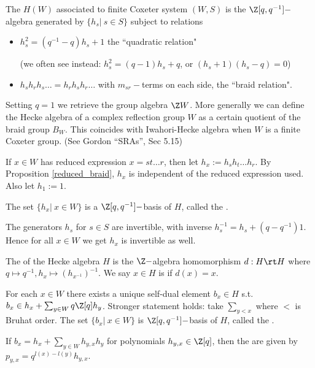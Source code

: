 \begin{definition} The  $H(W)$ associated to finite Coxeter system $(W,S)$ is the $\Z[q,q^{-1}]-$algebra generated by $\{h_s|\ s\in S\}$ subject to relations \begin{itemize}
  \item $h_s^2=(q^{-1}-q)h_s+1$ the ``quadratic relation" 
  
  (we often see instead: $h_s^2=(q-1)h_s+q$, or $(h_s+1)(h_s-q)=0$)
  \item $h_s h_r h_s\dots =h_r h_s h_r \dots $ with $m_{sr}-$terms on each side, the ``braid relation".
\end{itemize}
Setting $q=1$ we retrieve the group algebra $\Z W$. More generally we can define the Hecke algebra of a complex reflection group $W$ as a certain quotient of the braid group $B_W$. This coincides with Iwahori-Hecke algebra when $W$ is a finite Coxeter group. (See Gordon ``SRAs'', Sec 5.15)
\end{definition}

\nt If $x\in W$ has reduced expression $x=st\dots r$, then let $h_x:=h_s h_t\dots h_r$. By Proposition \ref{reduced_braid}, $h_x$ is independent of the reduced expression used. Also let $h_1:=1$.

\begin{lemma}[Iwahori] The set $\{h_x|\ x\in W\}$ is a $\Z[q,q^{-1}]-$basis of $H$, called the .
\end{lemma}

\nt The generators $h_s$ for $s\in S$ are invertible, with inverse $h_s^{-1}=h_s+(q-q^{-1})1$. Hence for all $x\in W$ we get $h_x$ is invertible as well.

\begin{definition} The  of the Hecke algebra $H$ is the $\Z-$algebra homomorphism $d:H\rt H$ where $q\mapsto q^{-1}, h_x\mapsto (h_{x^{-1}})^{-1}$. We say $x\in H$ is  if $d(x)=x$.
\end{definition}

\begin{theorem} For each $x\in W$ there exists a unique self-dual element $b_x\in H$ s.t. $b_x\in h_x+\sum_{y\in W} q\Z [q]h_y$. Stronger statement holds: take $\sum_{y<x}$ where $<$ is Bruhat order. The set $\{b_x|\ x\in W\}$ is $\Z[q,q^{-1}]-$basis of $H$, called the .\bb

\nt If $b_x=h_x+\sum_{y\in W}h_{y,x}h_y$ for polynomials $h_{y,x}\in \Z[q]$, then the  are given by $p_{y,x}=q^{l(x)-l(y)}h_{y,x}$.
\end{theorem}

